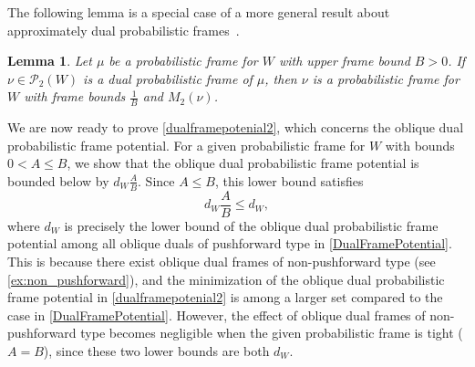 \documentclass{amsart}
\numberwithin{equation}{section}
\theoremstyle{plain}
\newtheorem{lemma}[theorem]{Lemma}
\theoremstyle{remark}
\theoremstyle{definition}
\begin{document}
The following lemma is a special case of a more general result about approximately dual probabilistic frames~\cite[Lemma 4.2]{chen2025redundancy}. 

\begin{lemma}\label{DualIsFrame}
Let $\mu$ be a probabilistic frame for $W$ with upper frame bound $B>0$.  If $\nu \in \mathcal{P}_2(W)$ is a dual probabilistic frame of $\mu$, then $\nu$ is a probabilistic frame for $W$ with frame bounds $\frac{1}{B}$ and $M_2(\nu)$. 
\end{lemma}

 We are now ready to prove  \cref{dualframepotenial2}, which concerns the oblique dual probabilistic frame potential. For a given probabilistic frame for $W$ with bounds $0<A \leq B$, we show that the oblique dual probabilistic frame potential is bounded below by $d_W \frac{A}{B}$. Since $A \leq B$, this lower bound satisfies
$$
d_W \frac{A}{B} \leq d_W,
$$
where $d_W$ is precisely the lower bound of the oblique dual probabilistic frame potential among all oblique duals of pushforward type in \cref{DualFramePotential}.  This is because there exist oblique dual frames of non-pushforward type (see \cref{ex:non_pushforward}), and the minimization of the oblique dual probabilistic frame potential in \cref{dualframepotenial2} is among a larger set compared to the case in \cref{DualFramePotential}. However,  the effect of oblique dual frames of non-pushforward type becomes negligible when the given probabilistic frame is tight ($A=B$), since these two lower bounds are both $d_W$. 
\end{document}
